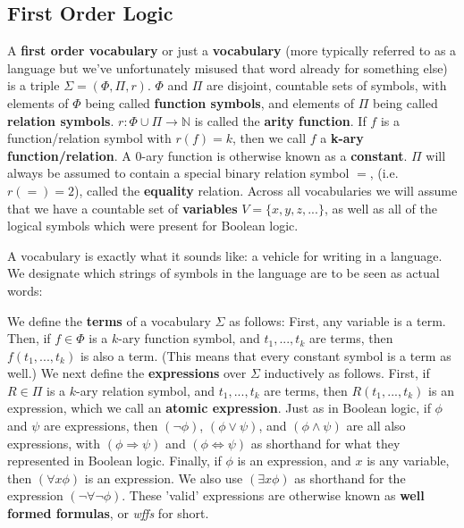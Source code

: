 \subsection{First Order Logic}
\begin{definition}
    A \textbf{first order vocabulary} or just a \textbf{vocabulary} (more typically referred to as a language but we've unfortunately misused that word already for something else) is a triple $\Sigma = (\Phi,\Pi,r)$. $\Phi$ and $\Pi$ are disjoint, countable sets of symbols, with elements of $\Phi$ being called \textbf{function symbols}, and elements of $\Pi$ being called \textbf{relation symbols}. $r: \Phi \cup \Pi \to \mathbb{N}$ is called the \textbf{arity function}. If $f$ is a function/relation symbol with $r(f)=k$, then we call $f$ a \textbf{k-ary function/relation}. A $0$-ary function is otherwise known as a \textbf{constant}. $\Pi$ will always be assumed to contain a special binary relation symbol $=$, (i.e. $r(=)=2$), called the \textbf{equality} relation. Across all vocabularies we will assume that we have a countable set of \textbf{variables} $V = \{x,y,z,...\}$, as well as all of the logical symbols which were present for Boolean logic. 
\end{definition} 
A vocabulary is exactly what it sounds like: a vehicle for writing in a language. We designate which strings of symbols in the language are to be seen as actual words: 
\begin{definition}
    We define the \textbf{terms} of a vocabulary $\Sigma$ as follows: First, any variable is a term. Then, if $f \in \Phi$ is a $k$-ary function symbol, and $t_1,...,t_k$ are terms, then $f(t_1,...,t_k)$ is also a term. (This means that every constant symbol is a term as well.) We next define the \textbf{expressions} over $\Sigma$ inductively as follows. First, if $R \in \Pi$ is a $k$-ary relation symbol, and $t_1,...,t_k$ are terms, then $R(t_1,...,t_k)$ is an expression, which we call an \textbf{atomic expression}. Just as in Boolean logic, if $\phi$ and $\psi$ are expressions, then $(\neg \phi)$, $(\phi \vee \psi)$, and $(\phi \wedge \psi)$ are all also expressions, with $(\phi \Rightarrow \psi)$ and $(\phi \iff \psi)$ as shorthand for what they represented in Boolean logic. Finally, if $\phi$ is an expression, and $x$ is any variable, then $(\forall x \phi)$ is an expression. We also use $(\exists x \phi)$ as shorthand for the expression $(\neg \forall \neg \phi)$. These 'valid' expressions are otherwise known as \textbf{well formed formulas}, or \textit{wffs} for short.
\end{definition}
